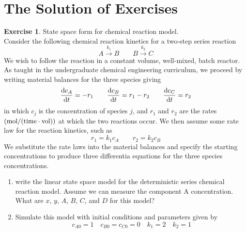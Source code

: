 \documentclass[11pt,a4paper]{report}
\theoremstyle{definition}\newtheorem{exercise}{Exercise}[chapter]
\begin{document}
\section{The Solution of Exercises}
\begin{exercise} State space form for chemical reaction model.\\
Consider the following chemical reaction kinetics for a two-step series reaction
\begin{equation}
    A\xrightarrow{k_1} B\qquad B\xrightarrow{k_2} C
\end{equation}
We wish to follow the reaction in a constant volume, well-mixed, batch reactor. As taught in the undergraduate chemical engineering curriculum, we proceed by writing material balances for the three species giving
\begin{equation}
    \dv{c_A}{t}=-r_1\qquad \dv{c_B}{t}=r_1-r_2\qquad \dv{c_C}{t}=r_2
\end{equation}
in which $c_j$ is the concentration of species $j$, and $r_1$ and $r_2$ are the rates $\rm (mol/(time\cdot vol))$ at which the two reactions occur. We then assume some rate law for the reaction kinetics, such as
\begin{equation}
    r_1=k_1 c_A\qquad r_2=k_2 c_B
\end{equation}
We substitute the rate laws into the material balances and specify the starting concentrations to produce three differentia equations for the three species concentrations. 

\begin{enumerate}[label=(\alph*)]
    \item write the linear state space model for the deterministic series chemical reaction model. Assume we can measure the component A concentration. What are $x$, $y$, $A$, $B$, $C$, and $D$ for this model?
    \item Simulate this model with initial conditions and parameters given by $$c_{A0}=1\quad c_{B0}=c_{C0}=0\quad k_1=2\quad k_2=1$$
\end{enumerate}
\end{exercise}
\end{document}
